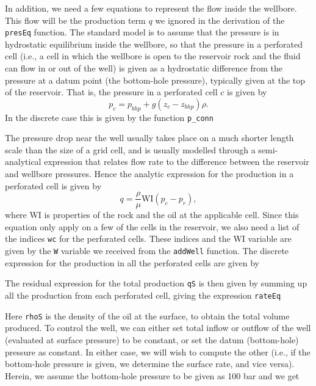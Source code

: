 In addition, we need a few equations to represent the flow inside the wellbore. This flow will be the production term $q$ we ignored in the derivation of the \texttt{presEq} function. The standard model is to assume that the pressure is in hydrostatic equilibrium inside the wellbore, so that the pressure in a perforated cell (i.e., a cell in which the wellbore is open to the reservoir rock and the fluid can flow in or out of the well) is given as a hydrostatic difference from the pressure at a datum point (the bottom-hole pressure), typically given at the top of the reservoir. That is, the pressure in a perforated cell $c$ is given by
\begin{equation*}
p_c = p_{bhp} + g (z_c - z_{bhp})\rho.    
\end{equation*}
In the discrete case this is given by the function \texttt{p\_conn}

The pressure drop near the well usually takes place on a much shorter length scale than the size of a grid cell, and is usually modelled through a semi-analytical expression that relates flow rate to the difference between the reservoir and wellbore pressures. Hence the analytic expression for the production in a perforated cell is given by
\begin{equation*}
    q = \frac{\rho}{\mu}\mbox{WI}(p_c - p_r),
\end{equation*}
where \mbox{WI} is properties of the rock and the oil at the applicable cell. Since this equation only apply on a few of the cells in the reservoir, we also need a list of the indices \texttt{wc} for the perforated cells. These indices and the \mbox{WI} variable are given by the \texttt{W} variable we received from the \texttt{addWell} function. The discrete expression for the production in all the perforated cells are given by

The residual expression for the total production \texttt{qS} is then given by summing up all the production from each perforated cell, giving the expression \texttt{rateEq}

Here \texttt{rhoS} is the density of the oil at the surface, to obtain the total volume produced. To control the well, we can either set total inflow or outflow of the well (evaluated at surface pressure) to be constant, or set the datum (bottom-hole) pressure as constant. In either case, we will wish to compute the other (i.e., if the bottom-hole pressure is given, we determine the surface rate, and vice versa). Herein, we assume the bottom-hole pressure to be given as 100 bar and we get

